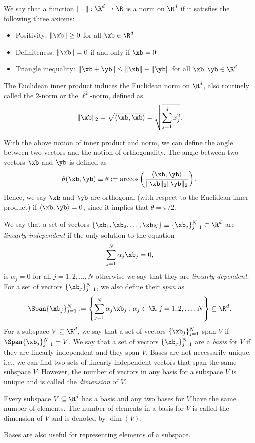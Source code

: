 \begin{definition}[Norm]
    We say that a function $\|\cdot\|: \R^d \to \R$ is a norm on $\R^d$ if it satisfies the following three axioms:
    \begin{itemize}
        \item Positivity: $\|\xb\| \ge 0$ for all $\xb \in \R^d$
        \item Definiteness: $\|\xb\| = 0$ if and only if $\xb = 0$
        \item Triangle inequality: $\|\xb + \yb\| \le \|\xb\| + \|\yb\|$ for all $\xb, \yb \in \R^d$
    \end{itemize}
\end{definition}
The Euclidean inner product induces the Euclidean norm on $\R^d$, 
also routinely called the $2$-norm or the $\ell^2$-norm, defined as
\begin{equation*}
    \|\xb\|_2 = \sqrt{\langle \xb, \xb \rangle} = \sqrt{\sum_{j=1}^d x_j^2}.
\end{equation*}

With the above notion of inner product and norm, we can define the angle between two vectors and the notion of orthogonality.
The angle between two vectors $\xb$ and $\yb$ is defined as
\begin{equation*}
   \theta(\xb, \yb) \equiv \theta := \arccos \left( \frac{\langle \xb, \yb \rangle}{\|\xb\|_2 \|\yb\|_2} \right),
\end{equation*}
Hence, we say $\xb$ and $\yb$ are orthogonal (with respect to 
the Euclidean inner product) if $\langle \xb, \yb \rangle = 0$,
since it implies that $\theta = \pi/2$.

We say that a set of vectors $\{\xb_1, \xb_2, \ldots, \xb_N\} \equiv 
\{ \xb_j \}_{j=1}^N \subset \R^d$ 
are {\it linearly independent} if the only solution to the equation
\begin{equation*}
    \sum_{j=1}^N \alpha_j \xb_j = 0,
\end{equation*}
is $\alpha_j = 0$ for all $j=1,2,\ldots,N$ otherwise we 
say that they are {\it linearly dependent}.
For a set of vectors $\{\xb_j\}_{j=1}^N$, we also define their {\it span} as
\begin{equation*}
    \Span\{\xb_j\}_{j=1}^N := \left\{ \sum_{j=1}^N \alpha_j \xb_j : \alpha_j \in \R, j=1,2,\ldots,N \right\} \subseteq \R^d.
\end{equation*}
For a subspace $V \subseteq \R^d$, we say that a set of vectors
$\{\xb_j\}_{j=1}^N$ span $V$ if $\Span\{\xb_j\}_{j=1}^N = V$.
We say that a set of vectors $\{\xb_j\}_{j=1}^N$ are a {\it basis} 
for $V$ if they are linearly independent and they span $V$. Bases are 
not necessarily unique, i.e., we can find two sets of linearly 
independent vectors that span the same subspace $V$. However,
the number of vectors in any basis for a subspace $V$ is unique and is called the {\it dimension} of $V$.
\begin{lemma}
    Every subspace $V \subseteq \R^d$ has a basis and any two bases for $V$ have the same number of elements. The number of elements in a basis for $V$ is called the dimension of $V$ and is denoted by $\dim(V)$.
\end{lemma}
Bases are also useful for representing elements of a subspace.

